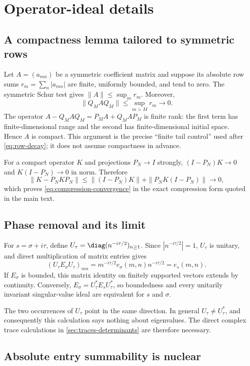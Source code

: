 \section{Operator-ideal details}
\label{app:operator-details}

\subsection{A compactness lemma tailored to symmetric rows}

Let $A=(a_{mn})$ be a symmetric coefficient matrix and suppose its absolute
row sums $r_m=\sum_n|a_{mn}|$ are finite, uniformly bounded, and tend to
zero.  The symmetric Schur test gives $\|A\|\leq\sup_m r_m$.  Moreover,
\[
 \|Q_MAQ_M\|\leq\sup_{m>M}r_m\longrightarrow0.
\]
The operator $A-Q_MAQ_M=P_MA+Q_MAP_M$ is finite rank: the first term has
finite-dimensional range and the second has finite-dimensional initial
space.  Hence $A$ is compact.  This argument is the precise ``finite tail
control'' used after \eqref{eq:row-decay}; it does not assume compactness in
advance.

For a compact operator $K$ and projections $P_N\to I$ strongly,
$(I-P_N)K\to0$ and $K(I-P_N)\to0$ in norm.  Therefore
\[
 \|K-P_NKP_N\|
 \leq\|(I-P_N)K\|+\|P_NK(I-P_N)\|\longrightarrow0,
\]
which proves \eqref{eq:compression-convergence} in the exact compression
form quoted in the main text.

\subsection{Phase removal and its limit}

For $s=\sigma+i\tau$, define
$U_\tau=\diag(n^{-i\tau/2})_{n\geq1}$.  Since $|n^{-i\tau/2}|=1$,
$U_\tau$ is unitary, and direct multiplication of matrix entries gives
\[
 (U_\tau E_\sigma U_\tau)_{mn}
 =m^{-i\tau/2}e_\sigma(m,n)n^{-i\tau/2}=e_s(m,n).
\]
If $E_\sigma$ is bounded, this matrix identity on finitely supported
vectors extends by continuity.  Conversely,
$E_\sigma=U_\tau^*E_sU_\tau^*$, so boundedness and every unitarily invariant
singular-value ideal are equivalent for $s$ and $\sigma$.

The two occurrences of $U_\tau$ point in the same direction.  In general
$U_\tau\neq U_\tau^*$, and consequently this calculation says nothing
about eigenvalues.  The direct complex trace calculations in
\cref{sec:traces-determinants} are therefore necessary.

\subsection{Absolute entry summability is nuclear}

